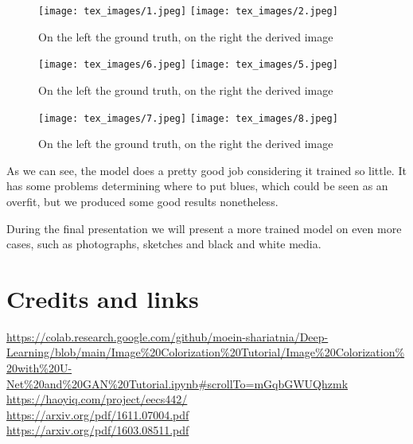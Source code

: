 \documentclass{article}
\begin{document}
        \begin{figure}[htp]

            \centering
            \texttt{[image: tex\_images/1.jpeg]}\hfill
            \texttt{[image: tex\_images/2.jpeg]}\hfill
            
            \caption{On the left the ground truth, on the right the derived image}
            \label{fig:figure 1.}
            
            \end{figure}

\pagebreak

            \begin{figure}[htp]

                \texttt{[image: tex\_images/6.jpeg]}\hfill
                \texttt{[image: tex\_images/5.jpeg]}\hfill
                
                \caption{On the left the ground truth, on the right the derived image}
                \label{fig:figure 1.}
                
                \end{figure}

                \begin{figure}[htp]

                    \texttt{[image: tex\_images/7.jpeg]}\hfill
                    \texttt{[image: tex\_images/8.jpeg]}\hfill
                    
                    \caption{On the left the ground truth, on the right the derived image}
                    \label{fig:figure 1.}
                    
                    \end{figure}
            As we can see, the model does a pretty good job considering it trained so 
            little. It has some problems determining where to put blues, which 
            could be seen as an overfit, but we produced some good results nonetheless.

            During the final presentation we will present a more trained model on 
            even more cases, such as photographs, sketches and black and white media.
            
            \pagebreak

            \section{Credits and links}
            \url{https://colab.research.google.com/github/moein-shariatnia/Deep-Learning/blob/main/Image%20Colorization%20Tutorial/Image%20Colorization%20with%20U-Net%20and%20GAN%20Tutorial.ipynb#scrollTo=mGqbGWUQhzmk}
            \url{https://haoyiq.com/project/eecs442/} \\
            \url{https://arxiv.org/pdf/1611.07004.pdf} \\
            \url{https://arxiv.org/pdf/1603.08511.pdf} \\
\end{document}
